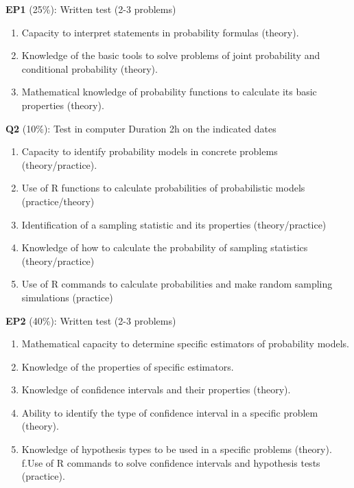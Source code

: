 \documentclass[
]{book}
\providecommand{\tightlist}{%
  \setlength{\itemsep}{0pt}\setlength{\parskip}{0pt}}
\begin{document}
\textbf{EP1} (25\%): Written test (2-3 problems)

\begin{enumerate}
\def\labelenumi{\alph{enumi}.}
\tightlist
\item
  Capacity to interpret statements in probability formulas (theory).
\item
  Knowledge of the basic tools to solve problems of joint probability and conditional probability (theory).
\item
  Mathematical knowledge of probability functions to calculate its basic properties (theory).
\end{enumerate}

\textbf{Q2} (10\%): Test in computer Duration 2h on the indicated dates

\begin{enumerate}
\def\labelenumi{\alph{enumi}.}
\tightlist
\item
  Capacity to identify probability models in concrete problems (theory/practice).
\item
  Use of R functions to calculate probabilities of probabilistic models (practice/theory)
\item
  Identification of a sampling statistic and its properties (theory/practice)
\item
  Knowledge of how to calculate the probability of sampling statistics (theory/practice)
\item
  Use of R commands to calculate probabilities and make random sampling simulations (practice)
\end{enumerate}

\textbf{EP2} (40\%): Written test (2-3 problems)

\begin{enumerate}
\def\labelenumi{\alph{enumi}.}
\tightlist
\item
  Mathematical capacity to determine specific estimators of probability models.
\item
  Knowledge of the properties of specific estimators.
\item
  Knowledge of confidence intervals and their properties (theory).
\item
  Ability to identify the type of confidence interval in a specific problem (theory).
\item
  Knowledge
  of hypothesis types to be used in a specific problems (theory).
  f.Use of R commands to solve confidence intervals and hypothesis tests (practice).
\end{enumerate}
\end{document}
